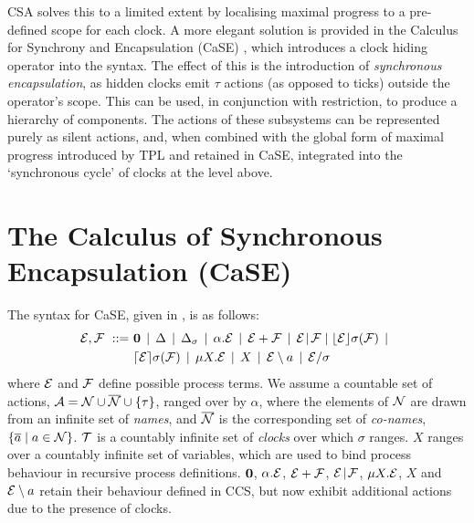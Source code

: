 CSA solves this to a limited extent by localising maximal progress to
a pre-defined scope for each clock.  A more elegant solution is
provided in the Calculus for Synchrony and Encapsulation (CaSE)
\cite{CaSE}, which introduces a clock hiding operator into the syntax.
The effect of this is the introduction of \emph{synchronous
  encapsulation}, as hidden clocks emit $\tau$ actions (as opposed to
ticks) outside the operator's scope.  This can be used, in conjunction
with restriction, to produce a hierarchy of components.  The actions
of these subsystems can be represented purely as silent actions, and,
when combined with the global form of maximal progress introduced by
TPL and retained in CaSE, integrated into the `synchronous cycle'
\cite{CaSE} of clocks at the level above.

\section{The Calculus of Synchronous Encapsulation (CaSE)}
\label{case}

The syntax for CaSE, given in \cite{norton05alg}, is as follows:
\begin{equation}
  \begin{aligned}
    \text{$\mathcal{E}$}, \text{$\mathcal{F}$}\ ::=\ &
    \textbf{0}  \;\,|\,\; 
    \Delta \;\,|\,\; 
    \Delta_{\sigma} \;\,|\,\; 
    \alpha . \text{$\mathcal{E}$}  \;\,|\,\;
    \text{$\mathcal{E}$} + \text{$\mathcal{F}$} \;\,|\,\; 
   \text{$\mathcal{E}$} \mathrel{\!|\!} \text{$\mathcal{F}$} \mid
    \lfloor{\text{$\mathcal{E}$}}\rfloor {\sigma} ({\text{$\mathcal{F}$}}) \;\,|\,\; \\
    & \lceil{\text{$\mathcal{E}$}}\rceil {\sigma} ({\text{$\mathcal{F}$}}) \;\,|\,\; 
    \mu X . \text{$\mathcal{E}$} \;\,|\,\; 
    X \;\,|\,\; 
    \text{$\mathcal{E}$} \setminus a \;\,|\,\; 
    \text{$\mathcal{E}$} / \sigma
  \end{aligned}
\end{equation}
where $\text{$\mathcal{E}$}$ and $\text{$\mathcal{F}$}$ define possible process terms. We assume a
countable set of actions, $\text{$\mathcal{A}$} = \text{$\mathcal{N}$} \cup \text{$\overline{\text{$\mathcal{N}$}}$} \cup
\{\tau\}$, ranged over by $\alpha$, where the elements of $\text{$\mathcal{N}$}$ are
drawn from an infinite set of \emph{names}, and $\text{$\overline{\text{$\mathcal{N}$}}$}$ is the
corresponding set of \emph{co-names}, $\{\overline{a} \mid a \in
\text{$\mathcal{N}$}\}$. $\text{$\mathcal{T}$}$ is a countably infinite set of \emph{clocks} over
which $\sigma$ ranges. $X$ ranges over a countably infinite set of
variables, which are used to bind process behaviour in recursive
process definitions. $\textbf{0}$, $\alpha . \text{$\mathcal{E}$}$, $\text{$\mathcal{E}$} + \text{$\mathcal{F}$}$,
$\text{$\mathcal{E}$} \mathrel{\!|\!} \text{$\mathcal{F}$}$, $\mu X . \text{$\mathcal{E}$}$, $X$ and $\text{$\mathcal{E}$}
\setminus a$ retain their behaviour defined in CCS, but now exhibit
additional actions due to the presence of clocks.


